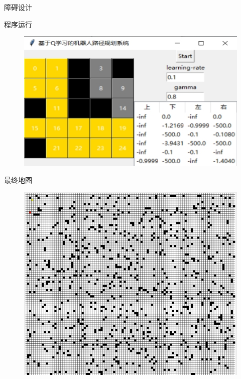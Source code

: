 \documentclass{beamer}
\begin{document}
\begin{frame}{障碍设计}
    \item 程序运行
    \begin{minipage}{1\linewidth}
        \medskip
        \begin{figure}[h]
            \centering
            \includegraphics[height=.8\textheight]{pic/21.jpg}
        \end{figure}
    \end{minipage}
\end{frame}


\begin{frame}{最终地图}

    
    \begin{minipage}{1\linewidth}
        \medskip
        \begin{figure}[h]
            \centering
            \includegraphics[height=.8\textheight]{pic/2.png}
        \end{figure}
    \end{minipage}
\end{frame}
\end{document}
